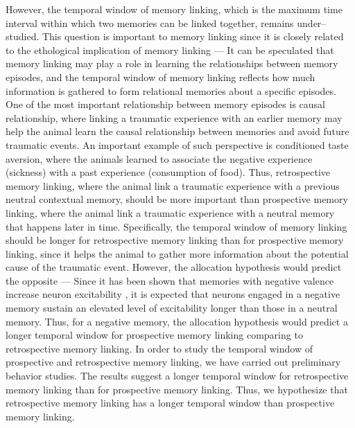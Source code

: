 \documentclass[master.tex]{subfiles}
\begin{document}
However, the temporal window of memory linking, which is the maximum time
interval within which two memories can be linked together, remains
under--studied. This question is important to memory linking since it is closely
related to the ethological implication of memory linking --- It can be
speculated that memory linking may play a role in learning the relationships
between memory episodes, and the temporal window of memory linking reflects how
much information is gathered to form relational memories about a specific
episodes. One of the most important relationship between memory episodes is
causal relationship, where linking a traumatic experience with an earlier memory
may help the animal learn the causal relationship between memories and avoid
future traumatic events. An important example of such perspective is conditioned
taste aversion, where the animals learned to associate the negative experience
(sickness) with a past experience (consumption of food). Thus, retrospective
memory linking, where the animal link a traumatic experience with a previous
neutral contextual memory, should be more important than prospective memory
linking, where the animal link a traumatic experience with a neutral memory that
happens later in time. Specifically, the temporal window of memory linking
should be longer for retrospective memory linking than for prospective memory
linking, since it helps the animal to gather more information about the
potential cause of the traumatic event. However, the allocation hypothesis would
predict the opposite --- Since it has been shown that memories with negative
valence increase neuron excitability \cite{rashid_competition_2016}, it is
expected that neurons engaged in a negative memory sustain an elevated level of
excitability longer than those in a neutral memory. Thus, for a negative memory,
the allocation hypothesis would predict a longer temporal window for prospective
memory linking comparing to retrospective memory linking. In order to study the
temporal window of prospective and retrospective memory linking, we have carried
out preliminary behavior studies. The results suggest a longer temporal window
for retrospective memory linking than for prospective memory linking. Thus, we
hypothesize that retrospective memory linking has a longer temporal window than
prospective memory linking.
\end{document}
